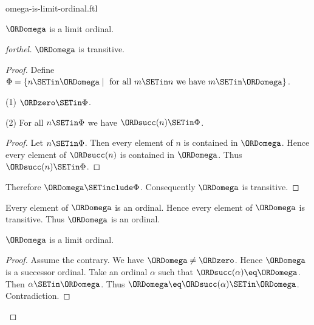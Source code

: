 \documentclass{naproche-library}
\begin{document}
\begin{smodule}[title=$\omega$ is a Limit Ordinal]{omega-is-limit-ordinal.ftl}

\begin{proposition}[forthel,id=SET_THEORY_03_764451995254784]
  $\ORDomega$ is a limit ordinal.
\end{proposition}
\begin{proof}[forthel]
  $\ORDomega$ is transitive.
  \begin{proof}
    Define $\Phi = \{ n \SETin \ORDomega \mid\text{ for all }m \SETin n\text{ we have }m \SETin \ORDomega \}$.

    (1) $\ORDzero \SETin \Phi$.

    (2) For all $n \SETin \Phi$ we have $\ORDsucc(n) \SETin \Phi$.
    \begin{proof}
      Let $n \SETin \Phi$.
      Then every element of $n$ is contained in $\ORDomega$.
      Hence every element of $\ORDsucc(n)$ is contained in $\ORDomega$.
      Thus $\ORDsucc(n) \SETin \Phi$.
    \end{proof}

    Therefore $\ORDomega \SETinclude \Phi$.
    Consequently $\ORDomega$ is transitive.
  \end{proof}

  Every element of $\ORDomega$ is an ordinal.
  Hence every element of $\ORDomega$ is transitive.
  Thus $\ORDomega$ is an ordinal.

  $\ORDomega$ is a limit ordinal.
  \begin{proof}
    Assume the contrary.
    We have $\ORDomega \neq \ORDzero$.
    Hence $\ORDomega$ is a successor ordinal.
    Take an ordinal $\alpha$ such that $\ORDsucc(\alpha) \eq \ORDomega$.
    Then $\alpha \SETin \ORDomega$.
    Thus $\ORDomega \eq \ORDsucc(\alpha) \SETin \ORDomega$.
    Contradiction.
  \end{proof}
\end{proof}
\end{smodule}
\end{document}
